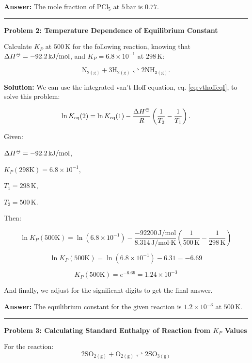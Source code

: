 \documentclass[
  9pt,
]{extbook}
\theoremstyle{definition}
\theoremstyle{definition}
\theoremstyle{definition}
\theoremstyle{remark}
\begin{document}
\textbf{Answer:} The mole fraction of \(\text{PCl}_5\) at \(5\,\text{bar}\) is \(0.77\).

\begin{center}\rule{0.5\linewidth}{0.5pt}\end{center}

\textbf{Problem 2: Temperature Dependence of Equilibrium Constant}

Calculate \(K_P\) at \(500\,\text{K}\) for the following reaction, knowing that \(\Delta H^{{-\kern-6pt{\ominus}\kern-6pt-}} = -92.2\,\text{kJ/mol}\), and \(K_P = 6.8 \times 10^{-1}\) at \(298\,\text{K}\):

\[\text{N}_{2(\text{g})} + 3\text{H}_{2(\text{g})} \rightleftharpoons 2\text{NH}_{3(\text{g})}.\]

\textbf{Solution:} We can use the integrated van't Hoff equation, eq. \eqref{eq:vthoffeqI}, to solve this problem:

\[\ln K_{\text{eq}}(2) = \ln K_{\text{eq}}(1) - \frac{\Delta H^{-\kern-6pt{\ominus}\kern-6pt-}}{R} \left( \frac{1}{T_2}-\frac{1}{T_1} \right).\]

Given:

\(\Delta H^{{-\kern-6pt{\ominus}\kern-6pt-}} = -92.2\,\text{kJ/mol}\),

\(K_P (298 \text{K})= 6.8 \times 10^{-1}\),

\(T_1=298\,\text{K}\),

\(T_2=500\,\text{K}\).

Then:

\[\ln K_{P}(500\text{K}) = \ln \left(6.8 \times 10^{-1}\right) -\frac{-92200\,\text{J/mol}}{8.314\,\text{J/mol·K}}\left(\frac{1}{500\,\text{K}} - \frac{1}{298\,\text{K}}\right)\]

\[\ln K_{P}(500\text{K}) = \ln(6.8 \times 10^{-1}) - 6.31 = -6.69\]

\[K_{P}(500\text{K}) = e^{-6.69} = 1.24 \times 10^{-3}\]

And finally, we adjust for the significant digits to get the final answer.

\textbf{Answer:} The equilibrium constant for the given reaction is \(1.2 \times 10^{-3}\) at \(500\,\text{K}\).

\begin{center}\rule{0.5\linewidth}{0.5pt}\end{center}

\textbf{Problem 3: Calculating Standard Enthalpy of Reaction from \(K_P\) Values}

For the reaction:
\[2\text{SO}_{2(\text{g})} + \text{O}_{2(\text{g})} \rightleftharpoons 2\text{SO}_{3(\text{g})}\]
\end{document}
